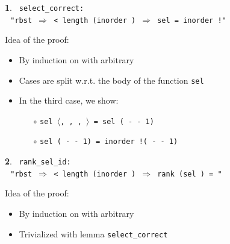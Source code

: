\documentclass[10pt]{beamer}
\newcommand{\lm}{{\color{isa_blue}{lemma}}}
\newcommand{\isa}[1]{\texttt{#1}}
\newcommand{\blue}[1]{{\color{isa_dark_blue}{#1}}}
\newcommand{\green}[1]{{\color{isa_dark_green}{#1}}}
\theoremstyle{definition}
\newtheorem*{isabelle}{}
\begin{document}
\begin{frame}
  \begin{isabelle}
    \isa{
      \lm{} select\_correct:\\ $~~~$"rbst \blue{t} $\Longrightarrow$ \blue{i} < length (inorder \blue{t}) $\Longrightarrow$ sel \blue{i} \blue{t} = inorder \blue{t}!\blue{i}"
    }
  \end{isabelle}
  \vfill
  Idea of the proof:
  \begin{itemize}
    \item By induction on \isa{\blue{t}} with \isa{\blue{i}} arbitrary
    \item Cases are split w.r.t. the body of the function \isa{sel}
    \item In the third case, we show:
      \begin{itemize}
        \item[$\circ$] \isa{sel \blue{i} $\langle$\green{l}, \green{n}, \green{x}, \green{r}$\rangle$ = sel (\blue{i} - \green{n} - 1) \green{r}}
        \item[$\circ$] \isa{sel (\blue{i} - \green{n} - 1) \green{r} = inorder \green{r}!(\blue{i} - \green{n} - 1)}
      \end{itemize}
  \end{itemize}
\end{frame}

\begin{frame}
  \begin{isabelle}
    \isa{
      \lm{} rank\_sel\_id:\\ $~~~$"rbst \blue{t} $\Longrightarrow$ \blue{i} < length (inorder \blue{t}) $\Longrightarrow$ rank (sel \blue{i} \blue{t}) \blue{t} = \blue{i}"
    }
  \end{isabelle}
  \vfill
  Idea of the proof:
  \begin{itemize}
    \item By induction on \isa{\blue{t}} with \isa{\blue{i}} arbitrary
    \item Trivialized with lemma \texttt{select\_correct}
  \end{itemize}
\end{frame}
\end{document}
